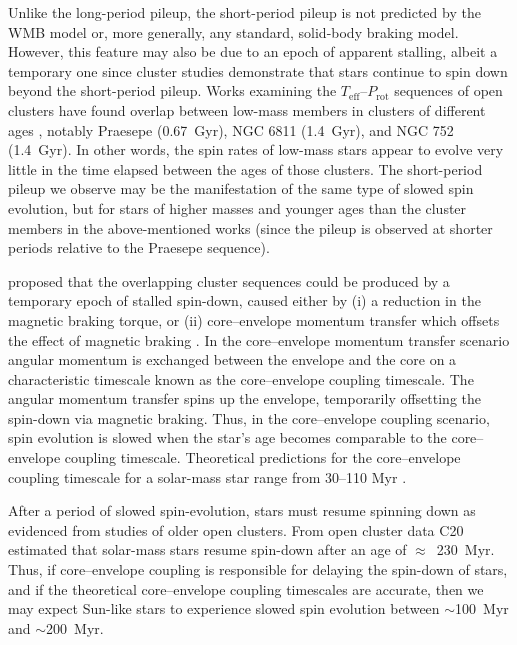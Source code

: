 \documentclass[trackchanges,twocolumn]{aastex631}
\newcommand{\curtis}{C20\xspace}
\newcommand{\teff}{\ensuremath{T_{\mathrm{eff}}}\xspace}
\newcommand{\prot}{\ensuremath{P_\mathrm{rot}}\xspace}
\begin{document}
Unlike the long-period pileup, the short-period pileup is not predicted by the WMB model or, more generally, any standard, solid-body braking model. However, this feature may also be due to an epoch of apparent stalling, albeit a temporary one since cluster studies demonstrate that stars continue to spin down beyond the short-period pileup. Works examining the \teff–\prot sequences of open clusters have found overlap between low-mass members in clusters of different ages \citep{Agueros2018, Curtis2019a, Curtis2020}, notably Praesepe (0.67~Gyr), NGC 6811 (1.4~Gyr), and NGC 752 (1.4~Gyr). In other words, the spin rates of low-mass stars appear to evolve very little in the time elapsed between the ages of those clusters. The short-period pileup we observe may be the manifestation of the same type of slowed spin evolution, but for stars of higher masses and younger ages than the cluster members in the above-mentioned works (since the pileup is observed at shorter periods relative to the Praesepe sequence). 

\citet{Curtis2019a, Curtis2020} proposed that the overlapping cluster sequences could be produced by a temporary epoch of stalled spin-down, caused either by (i) a reduction in the magnetic braking torque, or (ii) core–envelope momentum transfer which offsets the effect of magnetic braking \citep[e.g.][]{MacGregor1991}. In the core–envelope momentum transfer scenario angular momentum is exchanged between the envelope and the core on a characteristic timescale known as the core–envelope coupling timescale. The angular momentum transfer spins up the envelope, temporarily offsetting the spin-down via magnetic braking. Thus, in the core–envelope coupling scenario, spin evolution is slowed when the star's age becomes comparable to the core–envelope coupling timescale. Theoretical predictions for the core–envelope coupling timescale for a solar-mass star range from 30--110 Myr \citep{MacGregor1991,Krishnamurthi1997, Bouvier2008, IrwinBouvier2009, Denissenkov2010, GalletBouvier2015, Lanzafame2015, Somers2016, Spada2020}. 

After a period of slowed spin-evolution, stars must resume spinning down as evidenced from studies of older open clusters. From open cluster data \curtis estimated that solar-mass stars resume spin-down after an age of $\approx$~230~Myr. Thus, if core–envelope coupling is responsible for delaying the spin-down of stars, and if the theoretical core–envelope coupling timescales are accurate, then we may expect Sun-like stars to experience slowed spin evolution between $\sim$100~Myr and $\sim$200~Myr. 
\end{document}
